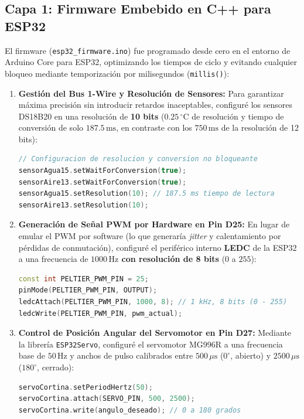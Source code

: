 \subsection{Capa 1: Firmware Embebido en C++ para ESP32}
El firmware (\texttt{esp32\_firmware.ino}) fue programado desde cero en el entorno de Arduino Core para ESP32, optimizando los tiempos de ciclo y evitando cualquier bloqueo mediante temporización por milisegundos (\texttt{millis()}):

\begin{enumerate}[label=\textbf{\alph*.}]
    \item \textbf{Gestión del Bus 1-Wire y Resolución de Sensores:}
    Para garantizar máxima precisión sin introducir retardos inaceptables, configuré los sensores DS18B20 en una resolución de \textbf{10 bits} ($0.25\,^\circ\text{C}$ de resolución y tiempo de conversión de solo $187.5\,\text{ms}$, en contraste con los $750\,\text{ms}$ de la resolución de 12 bits):
    \begin{lstlisting}[language=C++]
// Configuracion de resolucion y conversion no bloqueante
sensorAgua15.setWaitForConversion(true);
sensorAire13.setWaitForConversion(true);
sensorAgua15.setResolution(10); // 187.5 ms tiempo de lectura
sensorAire13.setResolution(10);
    \end{lstlisting}

    \item \textbf{Generación de Señal PWM por Hardware en Pin D25:}
    En lugar de emular el PWM por software (lo que generaría \textit{jitter} y calentamiento por pérdidas de conmutación), configuré el periférico interno \textbf{LEDC} de la ESP32 a una frecuencia de \textbf{$1000\,\text{Hz}$ con resolución de 8 bits} ($0$ a $255$):
    \begin{lstlisting}[language=C++]
const int PELTIER_PWM_PIN = 25;
pinMode(PELTIER_PWM_PIN, OUTPUT);
ledcAttach(PELTIER_PWM_PIN, 1000, 8); // 1 kHz, 8 bits (0 - 255)
ledcWrite(PELTIER_PWM_PIN, pwm_actual);
    \end{lstlisting}

    \item \textbf{Control de Posición Angular del Servomotor en Pin D27:}
    Mediante la librería \texttt{ESP32Servo}, configuré el servomotor MG996R a una frecuencia base de $50\,\text{Hz}$ y anchos de pulso calibrados entre $500\,\mu\text{s}$ ($0^\circ$, abierto) y $2500\,\mu\text{s}$ ($180^\circ$, cerrado):
    \begin{lstlisting}[language=C++]
servoCortina.setPeriodHertz(50);
servoCortina.attach(SERVO_PIN, 500, 2500);
servoCortina.write(angulo_deseado); // 0 a 180 grados
    \end{lstlisting}
\end{enumerate}

